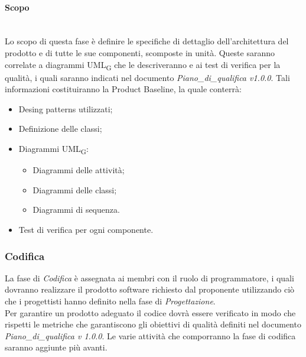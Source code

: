 	\paragraph {Scopo}\mbox{}\\
	Lo scopo di questa fase è definire le specifiche di dettaglio dell’architettura del prodotto e di tutte le sue componenti, scomposte in unità. Queste saranno correlate a diagrammi UML\textsubscript{G} che le descriveranno e ai test di verifica per la qualità, i quali saranno indicati nel documento \textit{Piano\_di\_qualifica v1.0.0}. Tali informazioni costituiranno la Product Baseline, la quale conterrà:
	\begin{itemize}
		\item Desing patterns utilizzati;
		\item Definizione delle classi;
		\item Diagrammi UML\textsubscript{G}:
		\begin{itemize}
			\item Diagrammi delle attività;
			\item Diagrammi delle classi;
			\item Diagrammi di sequenza.
		\end{itemize}
		\item Test di verifica per ogni componente.
	\end{itemize}
	\subsubsection{Codifica}
	La fase di \textit{Codifica} è assegnata ai membri con il ruolo di programmatore, i quali dovranno realizzare il prodotto software richiesto dal proponente utilizzando ciò che i progettisti hanno definito nella fase di \textit{Progettazione}.\\
	Per garantire un prodotto adeguato il codice dovrà essere verificato in modo che rispetti le metriche che garantiscono gli obiettivi di qualità definiti nel documento \textit{Piano\_di\_qualifica v 1.0.0}.
	Le varie attività che comporranno la fase di codifica saranno aggiunte più avanti. 

    
    
